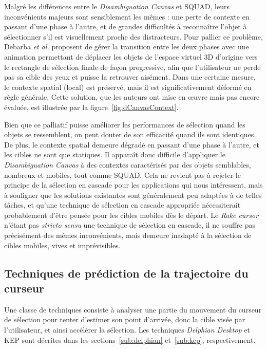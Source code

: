 	Malgré les différences entre le \emph{Disambiguation Canvas} et SQUAD, leurs inconvénients majeurs sont sensiblement les mêmes : une perte de contexte en passant d'une phase à l'autre, et de grandes difficultés à reconnaître l'objet à sélectionner s'il est visuellement proche des distracteurs. Pour pallier ce problème, Debarba \emph{et al.} proposent de gérer la transition entre les deux phases avec une animation permettant de déplacer les objets de l'espace virtuel 3D d'origine vers le rectangle de sélection finale de façon progressive, afin que l'utilisateur ne perde pas sa cible des yeux et puisse la retrouver aisément. Dans une certaine mesure, le contexte spatial (local) est préservé, mais il est significativement déformé en règle générale. Cette solution, que les auteurs ont mise en \oe{}uvre mais pas encore évaluée, est illustrée par la figure~\ref{fig:dCanvasContext}.
		
	Bien que ce palliatif puisse améliorer les performances de sélection quand les objets se ressemblent, on peut douter de son efficacité quand ils sont identiques. De plus, le contexte spatial demeure dégradé en passant d'une phase à l'autre, et les cibles ne sont que statiques. Il apparaît donc difficile d'appliquer le \emph{Disambiguation Canvas} à des contextes caractérisés par des objets semblables, nombreux et mobiles, tout comme SQUAD. Cela ne revient pas à rejeter le principe de la sélection en cascade pour les applications qui nous intéressent, mais à souligner que les solutions existantes sont généralement peu adaptées à de telles tâches, et qu'une technique de sélection en cascade appropriée nécessiterait probablement d'être pensée pour les cibles mobiles dès le départ. Le \emph{Rake cursor} n'étant pas \emph{stricto sensu} une technique de sélection en cascade, il ne souffre pas précisément des mêmes inconvénients, mais demeure inadapté à la sélection de cibles mobiles, vives et imprévisibles.
	
	\subsection{Techniques de prédiction de la trajectoire du curseur}
	Une classe de techniques consiste à analyser une partie du mouvement du curseur de sélection pour tenter d'estimer son point d'arrivée, donc la cible visée par l'utilisateur, et ainsi accélérer la sélection. Les techniques \emph{Delphian Desktop} et KEP sont décrites dans les sections~\ref{sub:delphian} et~\ref{sub:kep}, respectivement.

